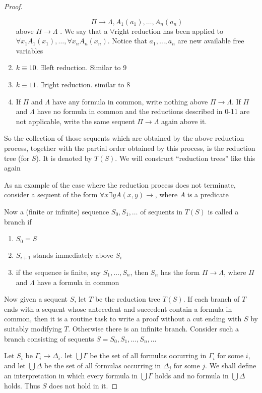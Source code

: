 \documentclass[11pt]{article}
\begin{document}
\begin{proof}
\begin{enumerate}
\begin{equation*}
\Pi\to\Lambda,A_1(a_1),\dots,A_n(a_n)
\end{equation*}
above \(\Pi\to\Lambda\) . We say that a \(\forall\)right reduction has been applied
to \(\forall x_1A_1(x_1),\dots,\forall x_nA_n(x_n)\). Notice that \(a_1,\dots,a_n\) are new available free variables
\item \(k\equiv10\). \(\exists\)left reduction. Similar to 9
\item \(k\equiv 11\). \(\exists\)right reduction. similar to 8
\item If \(\Pi\) and \(\Lambda\) have any formula in common, write nothing above \(\Pi\to\Lambda\). If \(\Pi\) and
\(\Lambda\) have no formula in common and the reductions described in 0-11 are not applicable, write
the same sequent \(\Pi\to\Lambda\) again above it.
\end{enumerate}


So the collection of those sequents which are obtained by the above reduction process, together
with the partial order obtained by this process, is the reduction tree (for \(S\)). It is denoted
by \(T(S)\). We will construct ``reduction trees'' like this again

As an example of the case where the reduction process does not terminate, consider a sequent of
the form \(\forall x\exists y A(x,y)\to\), where \(A\) is a predicate

Now a (finite or infinite) sequence \(S_0,S_1,\dots\) of sequents in \(T(S)\) is called a branch
if
\begin{enumerate}
\item \(S_0=S\)
\item \(S_{i+1}\) stands immediately above \(S_i\)
\item if the sequence is finite, say \(S_1,\dots,S_n\), then \(S_n\) has the form \(\Pi\to\Lambda\),
where \(\Pi\) and \(\Lambda\) have a formula in common
\end{enumerate}


Now given a sequent \(S\), let \(T\) be the reduction tree \(T(S)\). If each branch of \(T\) ends
with a sequent whose antecedent and succedent contain a formula in common, then it is a routine
task to write a proof without a cut ending with \(S\) by suitably modifying \(T\). Otherwise
there is an infinite branch. Consider such a branch consisting of sequents
\(S=S_0,S_1,\dots,S_n,\dots\)

Let \(S_i\) be \(\Gamma_i\to\Delta_i\). let \(\bigcup\Gamma\) be the set of all formulas
occurring in \(\Gamma_i\) for some \(i\), and let \(\bigcup\Delta\) be the set of all formulas
occurring in \(\Delta_j\) for some \(j\). We shall define an interpretation in which every
formula in \(\bigcup\Gamma\) holds and no formula in \(\bigcup\Delta\) holds. Thus \(S\) does not
hold in it.


\end{proof}
\end{document}
